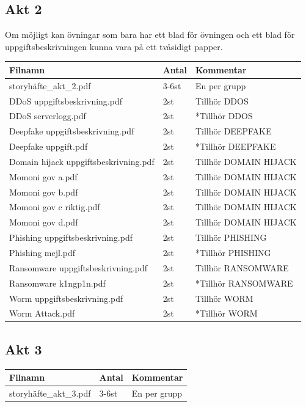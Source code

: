 \documentclass[a4paper,12pt]{article}
\begin{document}
\newpage

\subsection*{Akt 2}

Om möjligt kan övningar som bara har ett blad för övningen och ett blad för uppgiftsbeskrivningen kunna vara på ett tvåsidigt papper.

\begin{tabular}{|l|l|p{6cm}|}
\hline
\textbf{Filnamn} & \textbf{Antal} & \textbf{Kommentar} \\
\hline
storyhäfte\_akt\_2.pdf                  & 3-6st & En per grupp \\
\hline
DDoS uppgiftsbeskrivning.pdf            & 2st   & Tillhör DDOS \\
\hline
DDoS serverlogg.pdf                     & 2st   & *Tillhör DDOS \\
\hline
Deepfake uppgiftsbeskrivning.pdf        & 2st   & Tillhör DEEPFAKE \\
\hline
Deepfake uppgift.pdf                    & 2st   & *Tillhör DEEPFAKE \\
\hline
Domain hijack uppgiftsbeskrivning.pdf   & 2st   & Tillhör DOMAIN HIJACK \\
\hline
Momoni gov a.pdf                        & 2st   & Tillhör DOMAIN HIJACK \\
\hline
Momoni gov b.pdf                        & 2st   & Tillhör DOMAIN HIJACK \\
\hline
Momoni gov c riktig.pdf                 & 2st   & Tillhör DOMAIN HIJACK \\
\hline
Momoni gov d.pdf                        & 2st   & Tillhör DOMAIN HIJACK \\
\hline
Phishing uppgiftsbeskrivning.pdf        & 2st   & Tillhör PHISHING \\
\hline
Phishing mejl.pdf                       & 2st   & *Tillhör PHISHING \\
\hline
Ransomware uppgiftsbeskrivning.pdf      & 2st   & Tillhör RANSOMWARE \\
\hline
Ransomware k1ngp1n.pdf                  & 2st   & *Tillhör RANSOMWARE \\
\hline
Worm uppgiftsbeskrivning.pdf            & 2st   & Tillhör WORM \\
\hline
Worm Attack.pdf                         & 2st   & *Tillhör WORM \\
\hline
\end{tabular}

\subsection*{Akt 3}

\begin{tabular}{|l|l|p{6cm}|}
\hline
\textbf{Filnamn} & \textbf{Antal} & \textbf{Kommentar} \\
\hline
storyhäfte\_akt\_3.pdf & 3-6st & En per grupp \\
\hline
\end{tabular}
\end{document}
